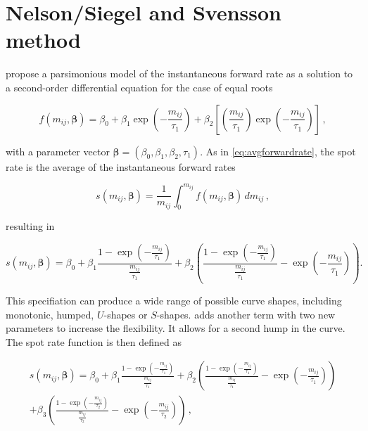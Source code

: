 \section{Nelson/Siegel and Svensson method}
\label{sec:nels-svenss-meth}

\cite{Nelson1987} propose a parsimonious  model of  the instantaneous forward rate as a solution to a second-order differential equation for the case of equal roots

\begin{equation}
  \label{eq:laguerre}
  f(m_{ij},\bm{\beta}) = \beta_0+\beta_1\exp\left(-\frac{m_{ij}}{\tau_1}\right)+\beta_2\left[\left(\frac{m_{ij}}{\tau_1}\right)\exp\left(-\frac{m_{ij}}{\tau_1}\right)\right]\,,
\end{equation}

with a parameter vector ${\bm{\beta}} = \left(\beta_0,\beta_1,\beta_2,\tau_1\right)$. As in \eqref{eq:avgforwardrate}, the spot rate is the average of the instantaneous forward rates

\begin{equation*}
  \label{eq:intspotrate}
  s(m_{ij},\bm{\beta})=\frac{1}{m_{ij}}\int_0^{m_{ij}}f(m_{ij},\bm{\beta})\,dm_{ij}\,,
\end{equation*}

resulting in

\begin{equation}
  \label{eq:nelson-spot}
   s(m_{ij},\bm{\beta}) = \beta_0 + \beta_1\frac{1-\exp(-\frac{m_{ij}}{\tau_1})}{\frac{m_{ij}}{\tau_1}} + \beta_2\left(\frac{1-\exp(-\frac{m_{ij}}{\tau_1})}{\frac{m_{ij}}{\tau_1}} - \exp(-\frac{m_{ij}}{\tau_1})\right).
\end{equation}

 
This specifiation can produce a wide range of possible curve shapes, including monotonic, humped, $U$-shapes or $S$-shapes. \cite{Svensson1994} adds another term with two new parameters to increase the flexibility. It allows for a second hump in the curve. The spot rate function is then defined as


\begin{multline}\label{eq:svensson-spot}
    s(m_{ij},\bm{\beta}) = \beta_0 + \beta_1\frac{1-\exp(-\frac{m_{ij}}{\tau_1})}{\frac{m_{ij}}{\tau_1}} + \beta_2\left(\frac{1-\exp(-\frac{m_{ij}}{\tau_1})}{\frac{m_{ij}}{\tau_1}} - \exp(-\frac{m_{ij}}{\tau_1})\right) \\+ \beta_3\left(\frac{1-\exp(-\frac{m_{ij}}{\tau_2})}{\frac{m_{ij}}{\tau_2}} - \exp(-\frac{m_{ij}}{\tau_2})\right)\,,
\end{multline}



